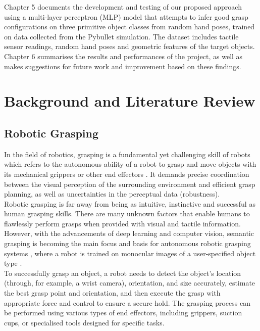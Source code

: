 \documentclass[11pt, a4paper]{report}
\begin{document}
Chapter 5 documents the development and testing of our proposed approach using a multi-layer perceptron (MLP) model that attempts to infer good grasp configurations on three primitive object classes from random hand poses, trained on data collected from the Pybullet simulation. The dataset includes tactile sensor readings, random hand poses and geometric features of the target objects.\\

Chapter 6 summarises the results and performances of the project, as well as makes suggestions for future work and improvement based on these findings.



\chapter{Background and Literature Review}\label{chap:2}


\section{Robotic Grasping}\label{sec:2.1}
In the field of robotics, grasping is a fundamental yet challenging skill of robots which refers to the autonomous ability of a robot to grasp and move objects with its mechanical grippers or other end effectors \cite{zhang2022robotic}. It demands precise coordination between the visual perception of the surrounding environment and efficient grasp planning, as well as uncertainties in the perceptual data (robustness).\\

Robotic grasping is far away from being as intuitive, instinctive and successful as human grasping skills. There are many unknown factors that enable humans to flawlessly perform grasps when provided with visual and tactile information. However, with the advancements of deep learning and computer vision, semantic grasping is becoming the main focus and basis for autonomous robotic grasping systems \cite{zhang2022robotic}, where a robot is trained on monocular images of a user-specified object type \cite{jang2017endtoend}.\\

To successfully grasp an object, a robot needs to detect the object's location (through, for example, a wrist camera), orientation, and size accurately, estimate the best grasp point and orientation, and then execute the grasp with appropriate force and control to ensure a secure hold. The grasping process can be performed using various types of end effectors, including grippers, suction cups, or specialised tools designed for specific tasks.\\
\end{document}
